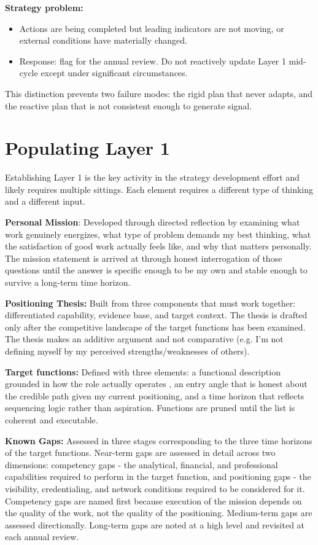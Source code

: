 \documentclass{article}
\begin{document}
\textbf{Strategy problem:}
\begin{itemize}
	\item Actions are being completed but leading indicators are not moving, or external conditions have materially changed.
	\item Response: flag for the annual review. Do not reactively update Layer 1 mid-cycle except under significant circumstances.
\end{itemize}

This distinction prevents two failure modes: the rigid plan that never adapts, and the reactive plan that is not consistent enough
to generate signal.

\newpage

\section{Populating Layer 1}

Establishing Layer 1 is the key activity in the strategy development effort and likely requires multiple sittings.
Each element requires a different type of thinking and a different input.

\textbf{Personal Mission}: Developed through directed reflection by examining what work genuinely energizes, what type of 
problem demands my best thinking, what the satisfaction of good work actually feels like, and why that matters personally. 
The mission statement is arrived at through honest interrogation of those questions until the answer is specific 
enough to be my own and stable enough to survive a long-term time horizon.

\textbf{Positioning Thesis:} Built from three components that must work together: differentiated capability, evidence base,
and target context. The thesis is drafted only after the competitive landscape of the target functions has been examined.
The thesis makes an additive argument and not comparative (e.g. I'm not defining myself by my perceived strengths/weaknesses of others).

\textbf{Target functions:} Defined with three elements: a functional description grounded in how the role actually operates 
, an entry angle that is honest about the credible path given my current positioning, and a time horizon that reflects 
sequencing logic rather than aspiration. Functions are pruned until the list is coherent and executable.

\textbf{Known Gaps:} Assessed in three stages corresponding to the three time horizons of the target functions.
Near-term gaps are assessed in detail across two dimensions: competency gaps - the analytical, financial, and professional 
capabilities required to perform in the target function, and positioning gaps - the visibility, credentialing, and network 
conditions required to be considered for it. Competency gaps are named first because execution of the mission depends on the 
quality of the work, not the quality of the positioning. Medium-term gaps are assessed directionally. Long-term 
gaps are noted at a high level and revisited at each annual review.
\end{document}
